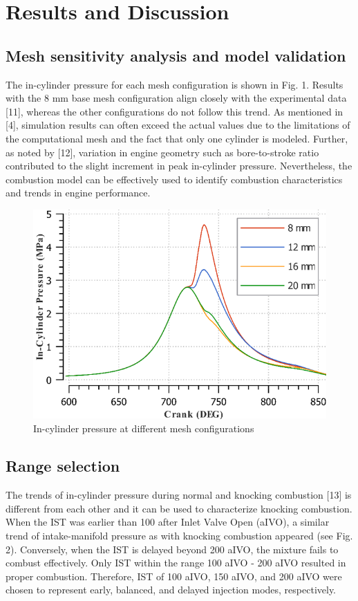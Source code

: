 \documentclass[conference]{IEEEtran}
\begin{document}
\section{Results and Discussion}
\subsection{Mesh sensitivity analysis and model validation}

The in-cylinder pressure for each mesh configuration is shown in Fig. 1. Results with the 8 mm base mesh configuration align closely with the experimental data [11], whereas the other configurations do not follow this trend. As mentioned in [4], simulation results can often exceed the actual values due to the limitations of the computational mesh and the fact that only one cylinder is modeled. Further, as noted by [12], variation in engine geometry such as bore-to-stroke ratio contributed to the slight increment in peak in-cylinder pressure. Nevertheless, the combustion model can be effectively used to identify combustion characteristics and trends in engine performance. 

\begin{figure}[htbp]
    \centerline{\includegraphics{plots and graphs/1.png}}
    \caption{In-cylinder pressure at different mesh configurations}
    \label{plt_1}
    \end{figure}



\subsection{Range selection}
The trends of in-cylinder pressure during normal and knocking combustion [13] is different from each other and it can be used to characterize knocking combustion. When the IST was earlier than 100 after Inlet Valve Open (aIVO), a similar trend of intake-manifold pressure as with knocking combustion appeared (see Fig. 2). Conversely, when the IST is delayed beyond 200 aIVO, the mixture fails to combust effectively. Only IST within the range 100 aIVO - 200 aIVO resulted in proper combustion. Therefore, IST of 100 aIVO, 150 aIVO, and 200 aIVO were chosen to represent early, balanced, and delayed injection modes, respectively.
\end{document}
